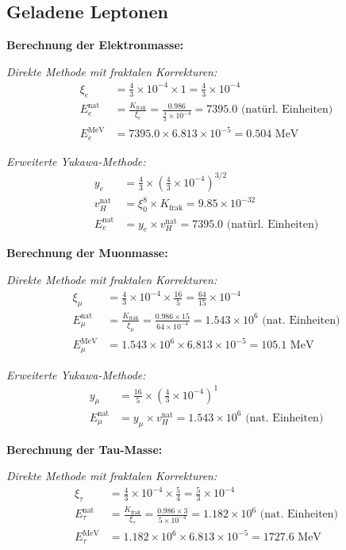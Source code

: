 \documentclass[12pt,a4paper]{article}
\begin{document}
\subsection{Geladene Leptonen}
\label{subsec:charged_leptons_enhanced}

\textbf{Berechnung der Elektronmasse:}

\textit{Direkte Methode mit fraktalen Korrekturen:}
\begin{align}
	\xi_e &= \frac{4}{3} \times 10^{-4} \times 1 = \frac{4}{3} \times 10^{-4} \\
	E_{e}^{\text{nat}} &= \frac{K_{\text{frak}}}{\xi_e} = \frac{0.986}{\tfrac{4}{3} \times 10^{-4}} 
	= 7395.0 \text{ (nat\"u{}rl. Einheiten)} \\
	E_e^{\text{MeV}} &= 7395.0 \times 6.813 \times 10^{-5} = 0.504 \text{ MeV}
\end{align}

\textit{Erweiterte Yukawa-Methode:}
\begin{align}
	y_e &= \frac{4}{3} \times \left(\frac{4}{3} \times 10^{-4}\right)^{3/2} \\
	v_H^{\text{nat}} &= \xi_0^8 \times K_{\text{frak}} = 9.85 \times 10^{-32} \\
	E_e^{\text{nat}} &= y_e \times v_H^{\text{nat}} = 7395.0 \text{ (nat\"u{}rl. Einheiten)}
\end{align}

\textbf{Berechnung der Muonmasse:}

\textit{Direkte Methode mit fraktalen Korrekturen:}
\begin{align}
	\xi_\mu &= \frac{4}{3} \times 10^{-4} \times \frac{16}{5} = \frac{64}{15} \times 10^{-4} \\
	E_{\mu}^{\text{nat}} &= \frac{K_{\text{frak}}}{\xi_\mu} = \frac{0.986 \times 15}{64 \times 10^{-4}} 
	= 1.543 \times 10^6 \text{ (nat. Einheiten)} \\
	E_\mu^{\text{MeV}} &= 1.543 \times 10^6 \times 6.813 \times 10^{-5} = 105.1 \text{ MeV}
\end{align}

\textit{Erweiterte Yukawa-Methode:}
\begin{align}
	y_\mu &= \frac{16}{5} \times \left(\frac{4}{3} \times 10^{-4}\right)^1 \\
	E_\mu^{\text{nat}} &= y_\mu \times v_H^{\text{nat}} = 1.543 \times 10^6 \text{ (nat. Einheiten)}
\end{align}

\textbf{Berechnung der Tau-Masse:}

\textit{Direkte Methode mit fraktalen Korrekturen:}
\begin{align}
	\xi_\tau &= \frac{4}{3} \times 10^{-4} \times \frac{5}{4} = \frac{5}{3} \times 10^{-4} \\
	E_{\tau}^{\text{nat}} &= \frac{K_{\text{frak}}}{\xi_\tau} = \frac{0.986 \times 3}{5 \times 10^{-4}} 
	= 1.182 \times 10^6 \text{ (nat. Einheiten)} \\
	E_\tau^{\text{MeV}} &= 1.182 \times 10^6 \times 6.813 \times 10^{-5} = 1727.6 \text{ MeV}
\end{align}
\end{document}
